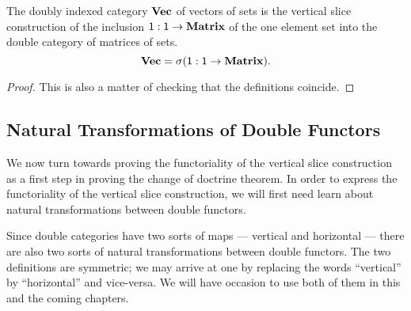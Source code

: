 \documentclass[DynamicalBook]{subfiles}
\begin{document}
\begin{proposition}
The doubly indexed category $\textbf{Vec}$ of vectors of sets is the vertical slice
construction of the inclusion $\mathsf{1} : \mathsf{1} \to \textbf{Matrix}$ of the one
element set into the double category of matrices of sets.
$$\textbf{Vec} = \sigma (\mathsf{1} : \mathsf{1} \to \textbf{Matrix}).$$
\end{proposition}
\begin{proof}
This is also a matter of checking that the definitions coincide.
\end{proof}

\subsection{Natural Transformations of Double Functors}
We now turn towards proving the functoriality of the vertical slice construction
as a first step in proving the change of doctrine theorem. In order to express
the functoriality of the vertical slice construction, we will first need learn
about natural transformations between double functors.

Since double categories have two sorts of maps --- vertical and horizontal ---
there are also two sorts of natural transformations between double functors. The
two definitions are symmetric; we may arrive at one by replacing the words
``vertical'' by ``horizontal'' and vice-versa. We will have occasion to use both
of them in this and the coming chapters.
\end{document}
